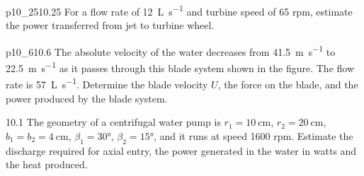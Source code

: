 
\begin{problemwithimage}{p10_25}{10.25}
  For a flow rate of \qty{12}{\L\per\s} and turbine speed of 65 rpm, estimate the power transferred from jet to turbine wheel.
\end{problemwithimage}

\begin{problemwithimage}{p10_6}{10.6}
  The absolute velocity of the water decreases from \qty{41,5}{\m\per\s} to \qty{22,5}{\m\per\s} as it passes through this blade system shown in the figure.
  The flow rate is \qty{57}{\L\per\s}.
  Determine the blade velocity $U$, the force on the blade, and the power produced by the blade system.
\end{problemwithimage}

\begin{problem}{10.1}
  The geometry of a centrifugal water pump is $r_1 = \qty{10}{\cm}$, $r_2 = \qty{20}{\cm}$, $b_1 = b_2 = \qty{4}{\cm}$, $\beta_1 = \ang{30}$, $\beta_2 = \ang{15}$, and it runs at speed 1600 rpm.
  Estimate the discharge required for axial entry, the power generated in the water in watts and the heat produced.
\end{problem}
